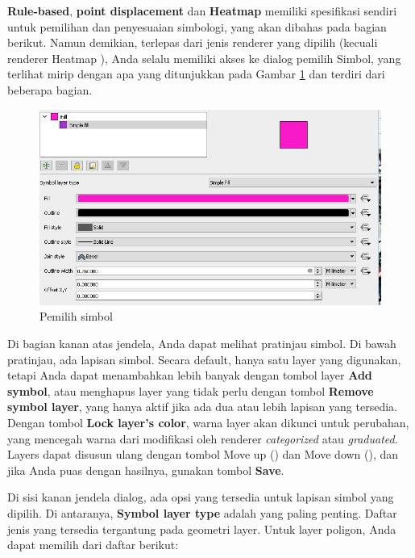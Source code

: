 \documentclass[]{book}
\begin{document}
\textbf{Rule-based}, \textbf{point displacement} dan \textbf{Heatmap} memiliki spesifikasi sendiri untuk pemilihan dan penyesuaian simbologi, yang akan dibahas pada bagian berikut. Namun demikian, terlepas dari jenis renderer yang dipilih (kecuali renderer Heatmap ), Anda selalu memiliki akses ke dialog pemilih Simbol, yang terlihat mirip dengan apa yang ditunjukkan pada Gambar \ref{fig:fig93} dan terdiri dari beberapa bagian.

\begin{figure}

{\centering \includegraphics[width=0.3\linewidth]{images/09/fig93} 

}

\caption{Pemilih simbol}\label{fig:fig93}
\end{figure}

Di bagian kanan atas jendela, Anda dapat melihat pratinjau simbol. Di bawah pratinjau, ada lapisan simbol. Secara default, hanya satu layer yang digunakan, tetapi Anda dapat menambahkan lebih banyak dengan tombol layer \textbf{Add symbol}, atau menghapus layer yang tidak perlu dengan tombol \textbf{Remove symbol layer}, yang hanya aktif jika ada dua atau lebih lapisan yang tersedia. Dengan tombol \textbf{Lock layer's color}, warna layer akan dikunci untuk perubahan, yang mencegah warna dari modifikasi oleh renderer \emph{categorized} atau \emph{graduated}. Layers dapat disusun ulang dengan tombol Move up () dan Move down (), dan jika Anda puas dengan hasilnya, gunakan tombol \textbf{Save}.

Di sisi kanan jendela dialog, ada opsi yang tersedia untuk lapisan simbol yang dipilih. Di antaranya, \textbf{Symbol layer type} adalah yang paling penting. Daftar jenis yang tersedia tergantung pada geometri layer. Untuk layer poligon, Anda dapat memilih dari daftar berikut:
\end{document}
